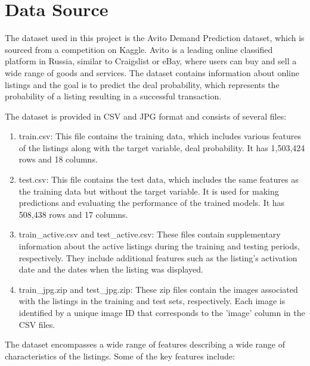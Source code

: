 \documentclass{article}
\begin{document}
\section{Data Source} 

The dataset used in this project is the Avito Demand Prediction dataset, which is sourced from a competition on Kaggle. Avito is a leading online classified platform in Russia, similar to Craigslist or eBay, where users can buy and sell a wide range of goods and services. The dataset contains information about online listings and the goal is to predict the deal probability, which represents the probability of a listing resulting in a successful transaction.

The dataset is provided in CSV and JPG format and consists of several files:

\begin{enumerate}
    \item train.csv: This file contains the training data, which includes various features of the listings along with the target variable, deal probability. It has 1,503,424 rows and 18 columns.
    \item test.csv: This file contains the test data, which includes the same features as the training data but without the target variable. It is used for making predictions and evaluating the performance of the trained models. It has 508,438 rows and 17 columns.
    \item train\_active.csv and test\_active.csv: These files contain supplementary information about the active listings during the training and testing periods, respectively. They include additional features such as the listing's activation date and the dates when the listing was displayed.
    \item train\_jpg.zip and test\_jpg.zip: These zip files contain the images associated with the listings in the training and test sets, respectively. Each image is identified by a unique image ID that corresponds to the 'image' column in the CSV files.
\end{enumerate}

The dataset encompasses a wide range of features describing a wide range of characteristics of the listings. Some of the key features include:
\end{document}

